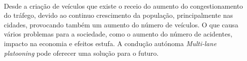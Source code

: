 \paragraph{}
Desde a criação de veículos que existe o receio do aumento do congestionamento do tráfego, devido   ao continuo crescimento da população, principalmente nas cidades, provocando também um aumento do número de veículos. O que causa vários problemas para a sociedade, como o aumento do número de acidentes, impacto na economia e efeitos estufa. A condução autónoma \textit{Multi-lane platooning} pode oferecer uma solução para o futuro.